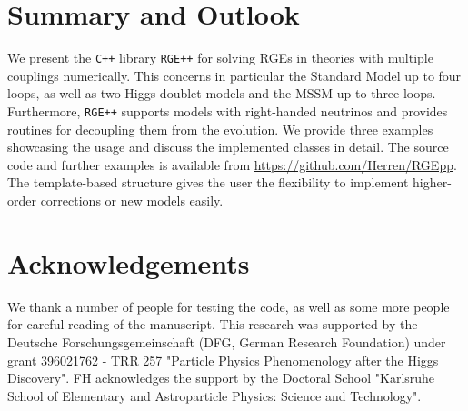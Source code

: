 \documentclass[11pt,a4paper]{article}
\begin{document}
\section{\label{sec::sum}Summary and Outlook}
We present the \texttt{C++} library \texttt{RGE++} for solving RGEs in theories with multiple couplings numerically. This concerns in particular the Standard Model up to four loops, as well as
two-Higgs-doublet models and the MSSM up to three loops. Furthermore, \texttt{RGE++} supports models with right-handed neutrinos and provides routines for decoupling them from the evolution.
We provide three examples showcasing the usage and discuss the implemented classes in detail. The source code and further examples is available from \url{https://github.com/Herren/RGEpp}.
The template-based structure gives the user the flexibility to implement higher-order corrections or new models easily.

\section*{Acknowledgements}
We thank a number of people for testing the code, as well as some more people for careful reading of the manuscript.
This research was supported by the Deutsche Forschungsgemeinschaft (DFG, German Research Foundation) under grant 396021762 - TRR 257 "Particle Physics Phenomenology after the Higgs Discovery".
FH acknowledges the support by the Doctoral School "Karlsruhe School of Elementary and Astroparticle Physics: Science and Technology".

\printbibliography
\end{document}
